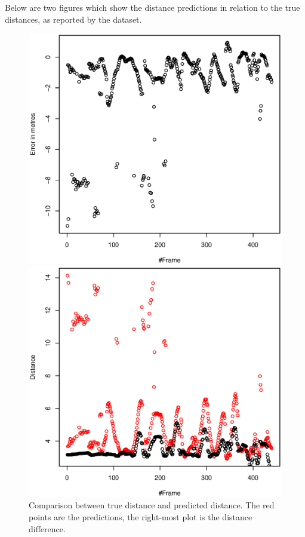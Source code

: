 \documentclass[a4paper]{article}
\begin{document}
Below are two figures which show the distance predictions in relation to the true distances, as reported by the dataset.
\begin{figure}[H]
\centering
  \begin{minipage}[]{0.49\textwidth}
    \centering
    \includegraphics[width=\textwidth]{results/distance-error.eps}
  \end{minipage}
  \begin{minipage}[]{0.48\textwidth}
    \centering
    \includegraphics[width=\textwidth]{results/distance-comparason.eps}
  \end{minipage}
  \label{fig:err-dist}
    \caption{Comparison between true distance and predicted distance. The red points are the predictions, the right-most plot is the distance difference.}
\end{figure}
\end{document}

